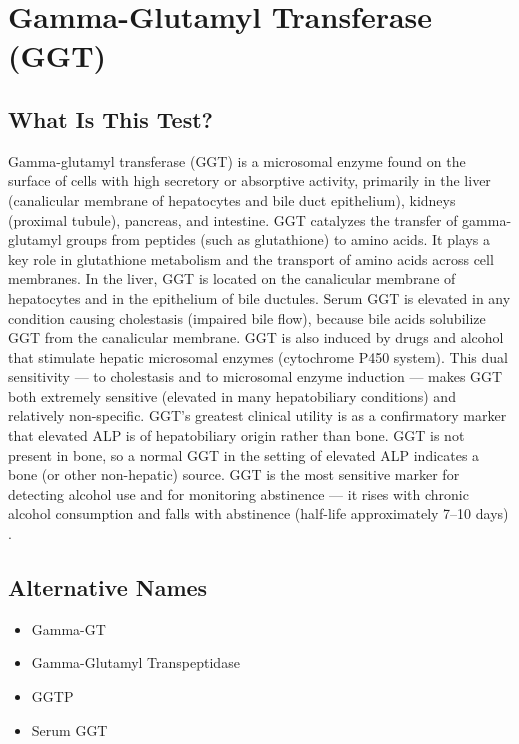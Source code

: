 \chapter{Gamma-Glutamyl Transferase (GGT)}

\section*{What Is This Test?}
Gamma-glutamyl transferase (GGT) is a microsomal enzyme found on the surface of cells with high secretory or absorptive activity, primarily in the liver (canalicular membrane of hepatocytes and bile duct epithelium), kidneys (proximal tubule), pancreas, and intestine. GGT catalyzes the transfer of gamma-glutamyl groups from peptides (such as glutathione) to amino acids. It plays a key role in glutathione metabolism and the transport of amino acids across cell membranes. In the liver, GGT is located on the canalicular membrane of hepatocytes and in the epithelium of bile ductules. Serum GGT is elevated in any condition causing cholestasis (impaired bile flow), because bile acids solubilize GGT from the canalicular membrane. GGT is also induced by drugs and alcohol that stimulate hepatic microsomal enzymes (cytochrome P450 system). This dual sensitivity --- to cholestasis and to microsomal enzyme induction --- makes GGT both extremely sensitive (elevated in many hepatobiliary conditions) and relatively non-specific. GGT's greatest clinical utility is as a confirmatory marker that elevated ALP is of hepatobiliary origin rather than bone. GGT is not present in bone, so a normal GGT in the setting of elevated ALP indicates a bone (or other non-hepatic) source. GGT is the most sensitive marker for detecting alcohol use and for monitoring abstinence --- it rises with chronic alcohol consumption and falls with abstinence (half-life approximately 7--10 days) \cite{whitfield2001gamma}.

\section*{Alternative Names}
\begin{itemize}
  \item Gamma-GT
  \item Gamma-Glutamyl Transpeptidase
  \item GGTP
  \item Serum GGT
\end{itemize}
